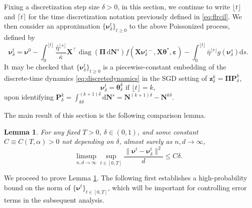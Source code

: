 \documentclass[11pt,letterpaper,reqno]{amsart}
\newtheorem{lem}[thm]{Lemma}
\theoremstyle{definition}
\def\d{\mathrm{d}}
\def\diag{\operatorname{diag}}
\def\z{\mathbf{z}}
\def\bN{\mathbf{N}}
\def\bP{\mathbf{P}}
\def\X{\mathbf{X}}
\def\beps{\boldsymbol{\varepsilon}}
\def\btheta{\boldsymbol{\theta}}
\def\bnu{\boldsymbol{\nu}}
\def\bPi{\boldsymbol{\Pi}}
\newcommand{\flr}[1]{{\lfloor {#1} \rfloor}}
\newcommand{\cil}[1]{{\lceil {#1} \rceil}}
\newcommand{\norm}[1]{\|#1\|}
\begin{document}
Fixing a discretization step size $\delta>0$, in this section, we continue
to write $\flr{t}$ and $\cil{t}$ for the time discretization notation
previously defined in \eqref{eq:flrcil}. We then consider an approximation
$\{\bnu_\delta^t\}_{t \geq 0}$ to the above Poissonized process, defined by
\begin{equation}\label{eq:deltaSGD}
\bnu_\delta^t = \bnu^0 - \int_0^{\flr{t}}
\frac{\bar\eta^{\flr{s}}}{\bar\kappa} \X^\top \diag(\bPi\,\d\bN^s)
f(\X\bnu_\delta^{s-},\X\btheta^*,\beps)
-\int_0^{\flr{t}} \bar \eta^{\flr{s}} g(\bnu_\delta^{s}) \d s.
\end{equation}
It may be checked that $\{\bnu_\delta^t\}_{t \geq 0}$ is a
piecewise-constant embedding of the discrete-time dynamics
\eqref{eq:discretedynamics} in the SGD setting of
$\z_\delta^k=\bPi\bP_\delta^k$,
\[\bnu_\delta^t=\btheta_\delta^k \text{ if } \flr{t}=k,\]
upon identifying $\bP_\delta^k=\int_{k\delta}^{(k+1)\delta} \d\bN^s
=\bN^{(k+1)\delta}-\bN^{k\delta}$.

The main result of this section is the following comparison lemma.

\begin{lem}\label{lem:disc-sgd}
For any fixed $T>0$, $\delta \in (0,1)$,
and some constant $C \equiv C(T,\alpha)>0$ not depending on $\delta$,
almost surely as $n,d \to \infty$,
\[\limsup_{n,d\to
\infty}\sup_{t\in[0,T]}\frac{\norm{\bnu^t-\bnu_\delta^t}^2}{d} \leq
C\delta.\]
\end{lem}

We proceed to prove Lemma \ref{lem:disc-sgd}.
The following first establishes a high-probability bound on
the norm of $\{\bnu^t\}_{t \in [0,T]}$, which
will be important for controlling error terms in the subsequent analysis.
\end{document}
